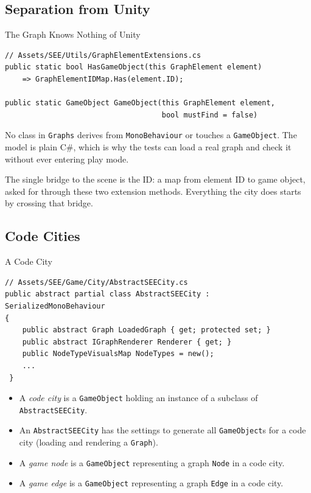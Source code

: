 \subsection{Separation from Unity}

\begin{frame}[fragile]{The Graph Knows Nothing of Unity}
  \begin{lstlisting}[basicstyle=\scriptsize\ttfamily]
// Assets/SEE/Utils/GraphElementExtensions.cs
public static bool HasGameObject(this GraphElement element)
    => GraphElementIDMap.Has(element.ID);

public static GameObject GameObject(this GraphElement element,
                                    bool mustFind = false)
  \end{lstlisting}
  \vspace{1ex}

  No class in \texttt{Graphs} derives from \texttt{MonoBehaviour} or
  touches a \texttt{GameObject}. The model is plain C\#, which is why the tests
  can load a real graph and check it without ever entering play mode.
  \vspace{1ex}

  The single bridge to the scene is the ID: a map from element ID to game
  object, asked for through these two extension methods. Everything the city
  does starts by crossing that bridge.
\end{frame}

\subsection{Code Cities}

\begin{frame}[fragile]{A Code City}
    \begin{lstlisting}[basicstyle=\scriptsize\ttfamily]
// Assets/SEE/Game/City/AbstractSEECity.cs
public abstract partial class AbstractSEECity : SerializedMonoBehaviour
{
    public abstract Graph LoadedGraph { get; protected set; }
    public abstract IGraphRenderer Renderer { get; }
    public NodeTypeVisualsMap NodeTypes = new();
    ...
 }
    \end{lstlisting}
    \vspace{1ex}

    \begin{itemize}
        \item A \textit{code city} is a \texttt{GameObject} holding an
        instance of a subclass of \texttt{AbstractSEECity}.
        \item An \texttt{AbstractSEECity} has the settings to generate
        all \texttt{GameObject}s for a code city (loading and rendering a \texttt{Graph}).
        \item A \textit{game node} is a \texttt{GameObject} representing
        a graph \texttt{Node} in a code city.
        \item A \textit{game edge} is a \texttt{GameObject} representing
        a graph \texttt{Edge} in a code city.
    \end{itemize}
\end{frame}

